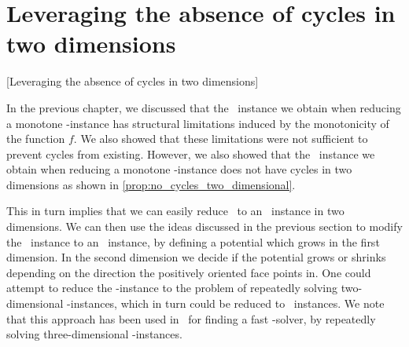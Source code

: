 \section{Leveraging the absence of cycles in two dimensions}[Leveraging the absence of cycles in two dimensions]

In the previous chapter, we discussed that the \EndOfLine\ instance we obtain when reducing a monotone \Tarskistar-instance has structural limitations induced by the monotonicity of the function $f$. We also showed that these limitations were not sufficient to prevent cycles from existing. However, we also showed that the \EndOfLine\ instance we obtain when reducing a monotone \Tarskistar-instance does not have cycles in two dimensions as shown in \cref{prop:no_cycles_two_dimensional}.

This in turn implies that we can easily reduce \Tarskistar\ to an \EndOfPotentialLine\ instance in two dimensions. We can then use the ideas discussed in the previous section to modify the \EndOfLine\ instance to an \EndOfPotentialLine\ instance, by defining a potential which grows in the first dimension. In the second dimension we decide if the potential grows or shrinks depending on the direction the positively oriented face points in. One could attempt to reduce the \Tarski-instance to the problem of repeatedly solving two-dimensional \Tarski-instances, which in turn could be reduced to \EndOfPotentialLine\ instances. We note that this approach has been used in~ for finding a fast \Tarski-solver, by repeatedly solving three-dimensional \Tarski-instances.